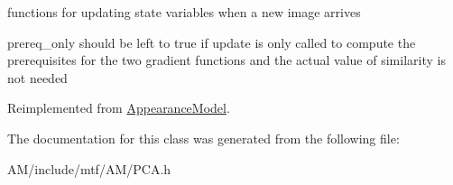 functions for updating state variables when a new image arrives 

prereq\-\_\-only should be left to true if update is only called to compute the prerequisites for the two gradient functions and the actual value of similarity is not needed 

Reimplemented from \hyperlink{classAppearanceModel_a06136ecd903e85ed2007da2c7b12bd58}{Appearance\-Model}.



The documentation for this class was generated from the following file\-:\begin{DoxyCompactItemize}
\item 
A\-M/include/mtf/\-A\-M/P\-C\-A.\-h\end{DoxyCompactItemize}
